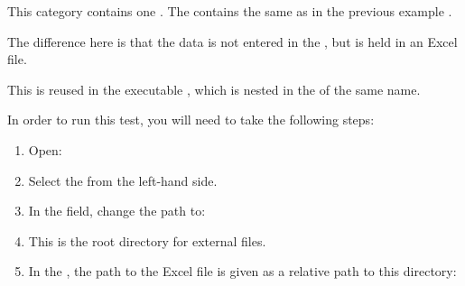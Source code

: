 
This category contains one \gdcase{}. The \gdcase{} contains the same \gdcase{} as in the previous example . 

The difference here is that the data is not entered in the \gddatasetsview{}, but is held in an Excel file. 


This \gdcase{} is reused in the executable \gdcase{} , which is nested in the \gdsuite{} of the same name. 


In order to run this test, you will need to take the following steps:
\begin{enumerate}
\item Open:\\
\item Select the  from the left-hand side.
\item In the  field, change the path to:\\
\item This is the root directory for external files. 
\item In the \gdpropview{}, the path to the Excel file is given as a relative path to this directory:\\
\end{enumerate}

